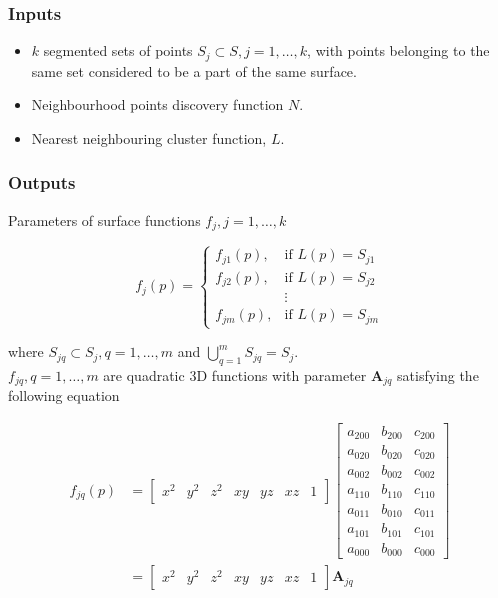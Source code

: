 \documentclass[12pt,a4paper]{article}
\begin{document}
    \subsubsection{Inputs}
    \begin{itemize}
        \itemsep0em
        \item $k$ segmented sets of points $S_j \subset S, j=1,\dots,k$, with points belonging to the same set considered to be a part of the same surface.
        \item Neighbourhood points discovery function $N$.
        \item Nearest neighbouring cluster function, $L$.
    \end{itemize}
    
    \subsubsection{Outputs}
    Parameters of surface functions $f_j, j=1,\dots,k$
    
    \[
    f_{j}(p)=\left\{\begin{array}{ll}{f_{j1}(p),}&{\text{if } L(p)=S_{j1}}\\{f_{j2}(p),}&{\text{if }L(p)=S_{j2}}\\{}&{\vdots}\\{f_{jm}(p),}&{\text{if }L(p)=S_{jm}}\end{array}\right.
    \]
    
    \noindent where $S_{jq} \subset S_{j}, q=1,\dots,m$ and $\bigcup\limits_{q=1}^{m} {S_{jq}} = S_j$.\\
    \noindent $f_{jq},q=1,\dots,m$ are quadratic 3D functions with parameter $\textbf{A}_{jq}$ satisfying the following equation
    
    \begin{equation}
    \begin{split}
    f_{jq}(p) & =
    \left[\begin{array}{ccccccc}{x^{2}}&{y^{2}}&{z^{2}}&{xy}&{yz}&{xz}&{1}\end{array}\right]
    \left[\begin{array}{ccc}a_{200}&b_{200}&c_{200}\\a_{020}&b_{020}&c_{020}\\a_{002}&b_{002}&c_{002}\\a_{110}& b_{110}& c_{110}\\a_{011}&b_{010}&c_{011}\\a_{101}&b_{101}&c_{101}\\a_{000}&b_{000}&c_{000}\end{array}\right]\\
    & = \left[\begin{array}{ccccccc}{x^{2}}&{y^{2}}&{z^{2}}&{xy}&{yz}&{xz}&{1}\end{array}\right] \textbf{A}_{jq}
    \end{split}
    \end{equation}
    
\end{document}
